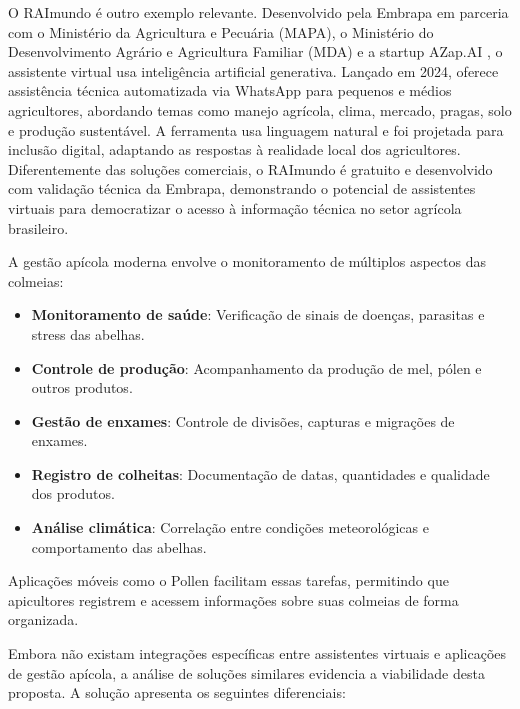O RAImundo é outro exemplo relevante. Desenvolvido pela Embrapa em parceria com o Ministério da Agricultura e Pecuária (MAPA), o Ministério do Desenvolvimento Agrário e Agricultura Familiar (MDA) e a startup AZap.AI \cite{embrapa2024raimundo}, o assistente virtual usa inteligência artificial generativa. Lançado em 2024, oferece assistência técnica automatizada via WhatsApp para pequenos e médios agricultores, abordando temas como manejo agrícola, clima, mercado, pragas, solo e produção sustentável. A ferramenta usa linguagem natural e foi projetada para inclusão digital, adaptando as respostas à realidade local dos agricultores. Diferentemente das soluções comerciais, o RAImundo é gratuito e desenvolvido com validação técnica da Embrapa, demonstrando o potencial de assistentes virtuais para democratizar o acesso à informação técnica no setor agrícola brasileiro.


A gestão apícola moderna envolve o monitoramento de múltiplos aspectos das colmeias:
\begin{itemize}
    \item \textbf{Monitoramento de saúde}: Verificação de sinais de doenças, parasitas e stress das abelhas.
    \item \textbf{Controle de produção}: Acompanhamento da produção de mel, pólen e outros produtos.
    \item \textbf{Gestão de enxames}: Controle de divisões, capturas e migrações de enxames.
    \item \textbf{Registro de colheitas}: Documentação de datas, quantidades e qualidade dos produtos.
    \item \textbf{Análise climática}: Correlação entre condições meteorológicas e comportamento das abelhas.
\end{itemize}

Aplicações móveis como o Pollen facilitam essas tarefas, permitindo que apicultores registrem e acessem informações sobre suas colmeias de forma organizada.


Embora não existam integrações específicas entre assistentes virtuais e aplicações de gestão apícola, a análise de soluções similares evidencia a viabilidade desta proposta. A solução apresenta os seguintes diferenciais:

